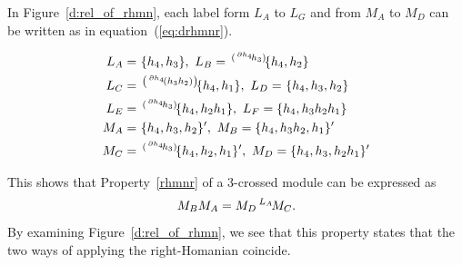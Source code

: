 \documentclass{tac}
\newcommand{\act}[1]{\,\sp{#1}\!}
\newcommand{\del}{\partial}
\begin{document}
\begin{appendices}
In Figure~\ref{d:rel_of_rhmn}, each label form $L_A$ to $L_G$ and from $M_A$ to $M_D$ can be written as in equation~(\ref{eq:drhmnr}).

\begin{equation}
\label{eq:drhmnr}
    \begin{aligned}
L_A &= \act{}\{h_4, h_3\}, \ 
L_B = \act{(\act{\del h_4}h_3)}\{h_4, h_2\} \\
L_C &= \act{\left(\act{\del h_4}(h_3h_2)\right)}\{h_4,h_1\}, \ 
L_D=\act{}\{h_4,h_3, h_2\} \\
L_E &=\act{(\act{\del h_4}h_3)}\{h_4,h_2h_1\}, \ 
L_F =\{h_4,h_3h_2h_1\}\\
M_A &= \act{}\{h_4, h_3, h_2\}', \ 
M_B =\{h_4, h_3 h_2, h_1\}'\\
M_C &= \act{(\act{\del h_4}h_3)}\{h_4,h_2,h_1\}', \ 
M_D = \{h_4,h_3, h_2h_1\}'
\end{aligned}
\end{equation}

This shows that Property~\ref{rhmnr} of a 3-crossed module can be expressed as 
\[
M_B M_A = M_D \act{L_A} M_C.
\]
By examining Figure~\ref{d:rel_of_rhmn}, we see that this property states that the two ways of applying the right-Homanian coincide.


\end{appendices}
\end{document}
